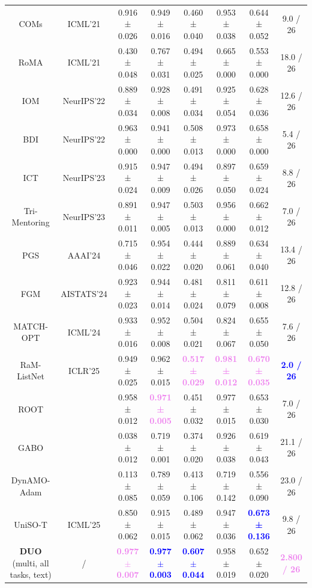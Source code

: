 \begin{table}[t!]
{\begin{tabular}{c|c|ccccc|c}
\midrule
COMs & ICML'21 & 0.916 ± 0.026 & 0.949 ± 0.016 & 0.460 ± 0.040 & 0.953 ± 0.038 & 0.644 ± 0.052 & 9.0 / 26 \\
RoMA & ICML'21 & 0.430 ± 0.048 & 0.767 ± 0.031 & 0.494 ± 0.025 & 0.665 ± 0.000 & 0.553 ± 0.000 & 18.0 / 26 \\
IOM & NeurIPS'22 & 0.889 ± 0.034 & 0.928 ± 0.008 & 0.491 ± 0.034 & 0.925 ± 0.054 & 0.628 ± 0.036 & 12.6 / 26 \\
BDI & NeurIPS'22 & 0.963 ± 0.000 & 0.941 ± 0.000 & 0.508 ± 0.013 & 0.973 ± 0.000 & 0.658 ± 0.000 & 5.4 / 26 \\
ICT & NeurIPS'23 & 0.915 ± 0.024 & 0.947 ± 0.009 & 0.494 ± 0.026 & 0.897 ± 0.050 & 0.659 ± 0.024 & 8.8 / 26 \\
Tri-Mentoring & NeurIPS'23 & 0.891 ± 0.011 & 0.947 ± 0.005 & 0.503 ± 0.013 & 0.956 ± 0.000 & 0.662 ± 0.012 & 7.0 / 26 \\
PGS & AAAI'24 & 0.715 ± 0.046 & 0.954 ± 0.022 & 0.444 ± 0.020 & 0.889 ± 0.061 & 0.634 ± 0.040 & 13.4 / 26 \\
FGM & AISTATS'24 & 0.923 ± 0.023 & 0.944 ± 0.014 & 0.481 ± 0.024 & 0.811 ± 0.079 & 0.611 ± 0.008 & 12.8 / 26 \\
MATCH-OPT & ICML'24 & 0.933 ± 0.016 & 0.952 ± 0.008 & 0.504 ± 0.021 & 0.824 ± 0.067 & 0.655 ± 0.050 & 7.6 / 26 \\
RaM-ListNet & ICLR'25 & 0.949 ± 0.025 & 0.962 ± 0.015 & \textbf{\textcolor{violet}{0.517 ± 0.029}} & \textbf{\textcolor{violet}{0.981 ± 0.012}} & \textbf{\textcolor{violet}{0.670 ± 0.035}} & \textbf{\textcolor{blue}{2.0 / 26}} \\
ROOT &  & 0.958 ± 0.012 & \textbf{\textcolor{violet}{0.971 ± 0.005}} & 0.451 ± 0.032 & 0.977 ± 0.015 & 0.653 ± 0.030 & 7.0 / 26 \\
GABO &  & 0.038 ± 0.012 & 0.719 ± 0.001 & 0.374 ± 0.020 & 0.926 ± 0.038 & 0.619 ± 0.043 & 21.1 / 26 \\
DynAMO-Adam &  & 0.113 ± 0.085 & 0.789 ± 0.059 & 0.413 ± 0.106 & 0.719 ± 0.142 & 0.556 ± 0.090 & 23.0 / 26 \\
\midrule
UniSO-T & ICML'25 & 0.850 ± 0.062 & 0.915 ± 0.015 & 0.489 ± 0.062 & 0.947 ± 0.036 & \textbf{\textcolor{blue}{0.673 ± 0.136}} & 9.8 / 26 \\
\midrule
\textbf{DUO} (multi, all tasks, text) & / & \textbf{\textcolor{violet}{0.977 $\pm$ 0.007}} & \textbf{\textcolor{blue}{0.977 $\pm$ 0.003}} & \textbf{\textcolor{blue}{0.607 $\pm$ 0.044}} & 0.958 $\pm$ 0.019 & 0.652 $\pm$ 0.020 & \textbf{\textcolor{violet}{2.800 / 26}} \\
\bottomrule
\end{tabular}
}
\label{tab:duo-nmax-designbench}
\end{table}
